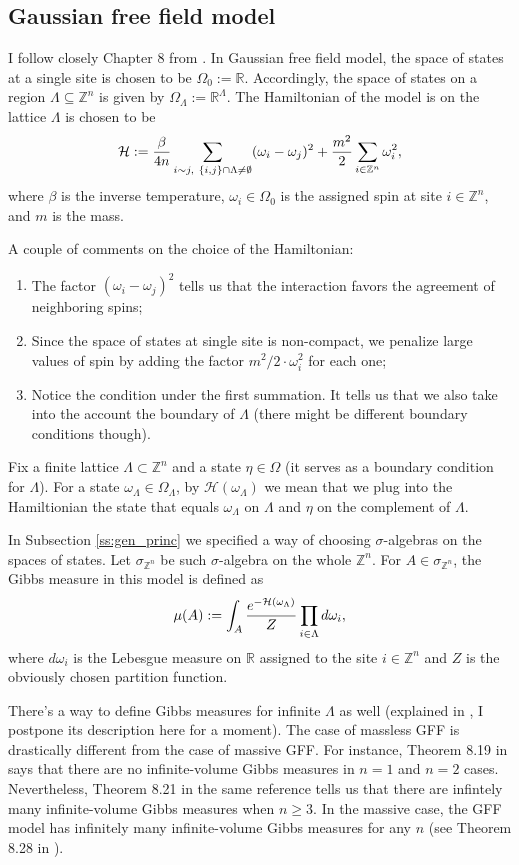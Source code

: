 \subsection{Gaussian free field model}
I follow closely Chapter 8 from \cite{friedli}. In Gaussian free field model, the space of states at a single site is chosen to be $\Omega_0 := \mathbb R$. Accordingly, the space of states on a region $\Lambda \subseteq \mathbb Z^n$ is given by $\Omega_{\Lambda} := \mathbb R^{\Lambda}$. The Hamiltonian of the model is on the lattice $\Lambda$ is chosen to be
\[
\mathcal{H} := \frac{\beta}{4n} \sum_{i \sim j, \ \{i,j\}\cap \Lambda \neq \emptyset} (\omega_i - \omega_j)^2 + \frac{m^2}{2} \sum_{i \in \mathbb Z^n} \omega_i^2,
\]
where $\beta$ is the inverse temperature, $\omega_i \in \Omega_0$ is the assigned spin at site $i \in \mathbb Z^n$, and $m$ is the mass.

A couple of comments on the choice of the Hamiltonian:
\begin{enumerate}[1)]
\item The factor $(\omega_i-\omega_j)^2$ tells us that the interaction favors the agreement of neighboring spins;
\item Since the space of states at single site is non-compact, we penalize large values of spin by adding the factor $m^2/2 \cdot \omega_i^2$ for each one;
\item Notice the condition under the first summation. It tells us that we also take into the account the boundary of $\Lambda$ (there might be different boundary conditions though).
\end{enumerate}
Fix a finite lattice $\Lambda \subset \mathbb Z^n$ and a state $\eta \in \Omega$ (it serves as a boundary condition for $\Lambda$). For a state $\omega_{\Lambda} \in \Omega_{\Lambda}$, by $\mathcal H(\omega_{\Lambda})$ we mean that we plug into the Hamiltionian the state that equals $\omega_{\Lambda}$ on $\Lambda$ and $\eta$ on the complement of $\Lambda$.

In Subsection \ref{ss:gen_princ} we specified a way of choosing $\sigma$-algebras on the spaces of states. Let $\sigma_{\mathbb Z^n}$ be such $\sigma$-algebra on the whole $\mathbb Z^n$. For $A \in \sigma_{\mathbb Z^n}$, the Gibbs measure in this model is defined as
\[
\mu(A) := \int_A \frac{e^{-\mathcal{H}(\omega_{\Lambda})}}{Z} \prod_{i \in \Lambda} d\omega_i,
\]
where $d\omega_i$ is the Lebesgue measure on $\mathbb R$ assigned to the site $i \in \mathbb Z^n$ and $Z$ is the obviously chosen partition function. 

There's a way to define Gibbs measures for infinite $\Lambda$ as well (explained in \cite{friedli}, I postpone its description here for a moment). The case of massless GFF is drastically different from the case of massive GFF. For instance, Theorem 8.19 in \cite{friedli} says that there are no infinite-volume Gibbs measures in $n=1$ and $n=2$ cases. Nevertheless, Theorem 8.21 in the same reference tells us that there are infintely many infinite-volume Gibbs measures when $n \geq 3$. In the massive case, the GFF model has infinitely many infinite-volume Gibbs measures for any $n$ (see Theorem 8.28 in \cite{friedli}).